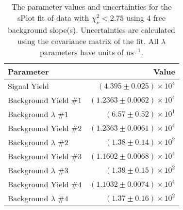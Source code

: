 
\begin{table}
    \begin{center}
        \begin{tabular}{lr}\toprule
            Parameter & Value \\\midrule
            Signal Yield & $(4.395 \pm 0.025) \times 10^{4}$ \\
            Background Yield $\#1$ & $(1.2363 \pm 0.0062) \times 10^{4}$ \\
            Background $\lambda$ $\#1$ & $(6.57 \pm 0.52) \times 10^{1}$ \\
            Background Yield $\#2$ & $(1.2363 \pm 0.0061) \times 10^{4}$ \\
            Background $\lambda$ $\#2$ & $(1.38 \pm 0.14) \times 10^{2}$ \\
            Background Yield $\#3$ & $(1.1602 \pm 0.0068) \times 10^{4}$ \\
            Background $\lambda$ $\#3$ & $(1.39 \pm 0.15) \times 10^{2}$ \\
            Background Yield $\#4$ & $(1.1032 \pm 0.0074) \times 10^{4}$ \\
            Background $\lambda$ $\#4$ & $(1.37 \pm 0.16) \times 10^{2}$ \\\bottomrule
        \end{tabular}
        \caption{The parameter values and uncertainties for the sPlot fit of data with $\chi^2_\nu < 2.75$ using 4 free background slope(s). Uncertainties are calculated using the covariance matrix of the fit. All $\lambda$ parameters have units of $\si{\nano\second}^{-1}$.}
    \end{center}
\end{table}
